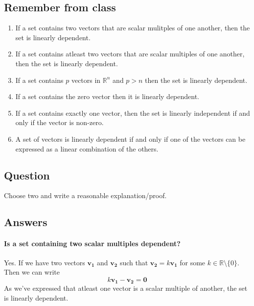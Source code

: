 \documentclass{article}
\begin{document}
        \subsection{Remember from class}
            \begin{enumerate}
                \item 
                    If a set contains two vectors that are scalar
                    mulitples of one another, then the set 
                    is linearly dependent.
                \item 
                    If a set contains atleast two vectors that are
                    scalar multiples of one another, then the set is linearly dependent.
                \item    
                    If a set contains $p$ vectors in $\mathbb{R}^n$ 
                    and $p > n$
                    then the set is linearly dependent.
                \item
                    If a set contains the zero vector then it is linearly dependent.
                \item 
                    If a set contains exactly one vector, then the set is linearly independent
                    if and only if the vector is non-zero.
                \item 
                    A set of vectors is linearly dependent if and only if
                    one of the vectors can be expressed as a linear combination of the others.
            \end{enumerate}
        \subsection{Question}
            Choose two and write a reasonable explanation/proof.
        \subsection{Answers}
            \paragraph{Is a set containing two scalar multiples dependent?}
                Yes. If we have two vectors $\mathbf{v_1}$ and $\mathbf{v_2}$
                such that $\mathbf{v_2} = k\mathbf{v_1}$ for some $k \in \mathbb{R} \setminus \{0\}$.
                Then we can write
                \[
                k\mathbf{v_1} - \mathbf{v_2} = \mathbf{0}
                \]
                As we've expressed that atleast one vector is a scalar multiple
                of another, the set is linearly dependent.
\end{document}
